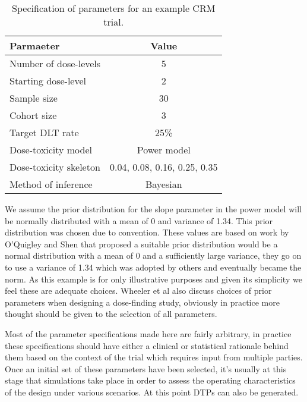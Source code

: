 \begin{table}[h!]
	\centering
	\caption{Specification of parameters for an example CRM trial. }
	\label{tab_tite-dtp:exampleCRMspecs}
	\begin{tabular}{l|c}
		\hline
		\textbf{Parmaeter}     & \textbf{Value}               \\ \hline
		Number of dose-levels  & 5                            \\
		Starting dose-level    & 2                            \\
		Sample size            & 30                           \\
		Cohort size            & 3                            \\
		Target DLT rate        & 25\%                         \\
		Dose-toxicity model    & Power model                  \\
		Dose-toxicity skeleton & 0.04, 0.08, 0.16, 0.25, 0.35 \\
		Method of inference    & Bayesian                     \\ \hline
	\end{tabular}
\end{table}

We assume the prior distribution for the slope parameter in the power model will be normally distributed with a mean of 0 and variance of 1.34. This prior distribution was chosen due to convention. These values are based on work by O'Quigley and Shen \cite{oquigleyContinualReassessmentMethod1996} that proposed a suitable prior distribution would be a normal distribution with a mean of 0 and a sufficiently large variance, they go on to use a variance of 1.34 which was adopted by others and eventually became the norm. As this example is for only illustrative purposes and given its simplicity we feel these are adequate choices. Wheeler et al \cite{wheelerHowDesignDosefinding2019} also discuss choices of prior parameters when designing a dose-finding study, obviously in practice more thought should be given to the selection of all parameters. 

Most of the parameter specifications made here are fairly arbitrary, in practice these specifications should have either a clinical or statistical rationale behind them based on the context of the trial which requires input from multiple parties. Once an initial set of these parameters have been selected, it's usually at this stage that simulations take place in order to assess the operating characteristics of the design under various scenarios. At this point DTPs can also be generated. 

